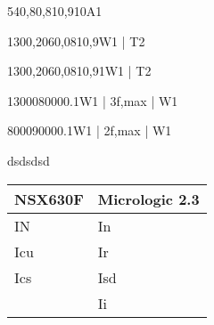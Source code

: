 \documentclass[a4paper,oneside,10pt,danish]{report}
\begin{document}
\begin{faseKOMP-Iny}{540,8}{0,81}{0,9}{10}{A1}
\end{faseKOMP-Iny}

\begin{HV-deltaUnet}{130}{0,206}{0,081}{0,9}{W1 | T2}
\end{HV-deltaUnet}

\begin{LV-deltaU}{130}{0,206}{0,081}{0,9}{1}{W1 | T2}
\end{LV-deltaU}

\begin{HV-KBtid-leder}{13000}{8000}{0.1}{W1 | 3f,max | W1}
\end{HV-KBtid-leder}

\begin{HV-KBtid-skærm}{8000}{9000}{0.1}{W1 | 2f,max | W1}
\end{HV-KBtid-skærm}
dsdsdsd
\begin{table}[https]
	\begin{tabular}{l|l}
		NSX630F & Micrologic 2.3 \\ \hline
		IN      & In             \\
		Icu     & Ir             \\
		Ics     & Isd            \\
		& Ii            
	\end{tabular}
\end{table}
\end{document}
